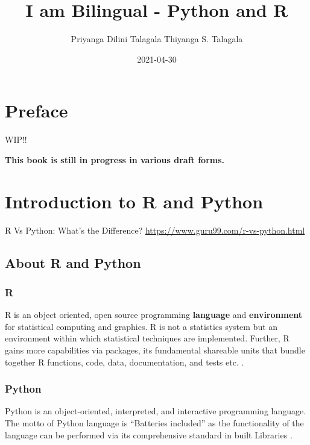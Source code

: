 \documentclass[]{book}
\title{I am Bilingual - Python and R}
\author{Priyanga Dilini Talagala Thiyanga S. Talagala}
\date{2021-04-30}
\begin{document}
\maketitle

{
\setcounter{tocdepth}{1}
\tableofcontents
}
\hypertarget{preface}{%
\chapter*{Preface}\label{preface}}

WIP!!

\textbf{This book is still in progress in various draft forms.}

\hypertarget{intro}{%
\chapter{Introduction to R and Python}\label{intro}}

R Vs Python: What's the Difference? \url{https://www.guru99.com/r-vs-python.html}

\hypertarget{about-r-and-python}{%
\section{About R and Python}\label{about-r-and-python}}

\hypertarget{r}{%
\subsection{R}\label{r}}

R is an object oriented, open source programming \textbf{language} and \textbf{environment} for statistical computing and graphics. R is not a statistics system but an environment within which statistical techniques are implemented. Further, R gains more capabilities via packages, its fundamental shareable units that bundle together R functions, code, data, documentation, and tests etc. \citep{Rcoreteam2020}.

\hypertarget{python}{%
\subsection{Python}\label{python}}

Python is an object-oriented, interpreted, and interactive programming language. The motto of Python language is ``Batteries included'' as the functionality of the language can be performed via its comprehensive standard in built Libraries \citep{wikipython}.
\end{document}
